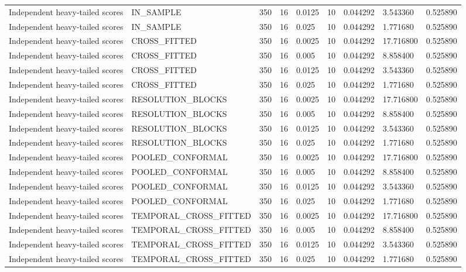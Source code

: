 \begin{tabular}{lllllllll}
Independent heavy-tailed scores & IN\_SAMPLE & 350 & 16 & 0.0125 & 10 & 0.044292 & 3.543360 & 0.525890 \\
Independent heavy-tailed scores & IN\_SAMPLE & 350 & 16 & 0.025 & 10 & 0.044292 & 1.771680 & 0.525890 \\
Independent heavy-tailed scores & CROSS\_FITTED & 350 & 16 & 0.0025 & 10 & 0.044292 & 17.716800 & 0.525890 \\
Independent heavy-tailed scores & CROSS\_FITTED & 350 & 16 & 0.005 & 10 & 0.044292 & 8.858400 & 0.525890 \\
Independent heavy-tailed scores & CROSS\_FITTED & 350 & 16 & 0.0125 & 10 & 0.044292 & 3.543360 & 0.525890 \\
Independent heavy-tailed scores & CROSS\_FITTED & 350 & 16 & 0.025 & 10 & 0.044292 & 1.771680 & 0.525890 \\
Independent heavy-tailed scores & RESOLUTION\_BLOCKS & 350 & 16 & 0.0025 & 10 & 0.044292 & 17.716800 & 0.525890 \\
Independent heavy-tailed scores & RESOLUTION\_BLOCKS & 350 & 16 & 0.005 & 10 & 0.044292 & 8.858400 & 0.525890 \\
Independent heavy-tailed scores & RESOLUTION\_BLOCKS & 350 & 16 & 0.0125 & 10 & 0.044292 & 3.543360 & 0.525890 \\
Independent heavy-tailed scores & RESOLUTION\_BLOCKS & 350 & 16 & 0.025 & 10 & 0.044292 & 1.771680 & 0.525890 \\
Independent heavy-tailed scores & POOLED\_CONFORMAL & 350 & 16 & 0.0025 & 10 & 0.044292 & 17.716800 & 0.525890 \\
Independent heavy-tailed scores & POOLED\_CONFORMAL & 350 & 16 & 0.005 & 10 & 0.044292 & 8.858400 & 0.525890 \\
Independent heavy-tailed scores & POOLED\_CONFORMAL & 350 & 16 & 0.0125 & 10 & 0.044292 & 3.543360 & 0.525890 \\
Independent heavy-tailed scores & POOLED\_CONFORMAL & 350 & 16 & 0.025 & 10 & 0.044292 & 1.771680 & 0.525890 \\
Independent heavy-tailed scores & TEMPORAL\_CROSS\_FITTED & 350 & 16 & 0.0025 & 10 & 0.044292 & 17.716800 & 0.525890 \\
Independent heavy-tailed scores & TEMPORAL\_CROSS\_FITTED & 350 & 16 & 0.005 & 10 & 0.044292 & 8.858400 & 0.525890 \\
Independent heavy-tailed scores & TEMPORAL\_CROSS\_FITTED & 350 & 16 & 0.0125 & 10 & 0.044292 & 3.543360 & 0.525890 \\
Independent heavy-tailed scores & TEMPORAL\_CROSS\_FITTED & 350 & 16 & 0.025 & 10 & 0.044292 & 1.771680 & 0.525890 \\

\end{tabular}
